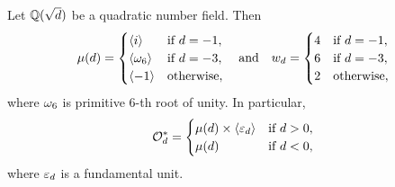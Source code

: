     \begin{proposition}\label{prop:unit_group_quadratic}
      Let $\mathbb{Q}(\sqrt{d})$ be a quadratic number field. Then
      \[
        \mu(d) = \begin{cases} \langle i\rangle & \text{if $d = -1$}, \\ \langle\omega_{6}\rangle & \text{if $d = -3$}, \\ \langle-1\rangle & \text{otherwise}, \end{cases} \quad \text{and} \quad w_{d} = \begin{cases} 4 & \text{if $d = -1$}, \\ 6 & \text{if $d = -3$}, \\ 2 & \text{otherwise}, \end{cases}
      \]
      where $\omega_{6}$ is primitive $6$-th root of unity. In particular,
      \[
        \mathcal{O}_{d}^{\ast} = \begin{cases} \mu(d) \times \langle\varepsilon_{d}\rangle & \text{if $d > 0$}, \\ \mu(d) & \text{if $d < 0$}, \end{cases}
      \]
      where $\varepsilon_{d}$ is a fundamental unit.
    \end{proposition}
